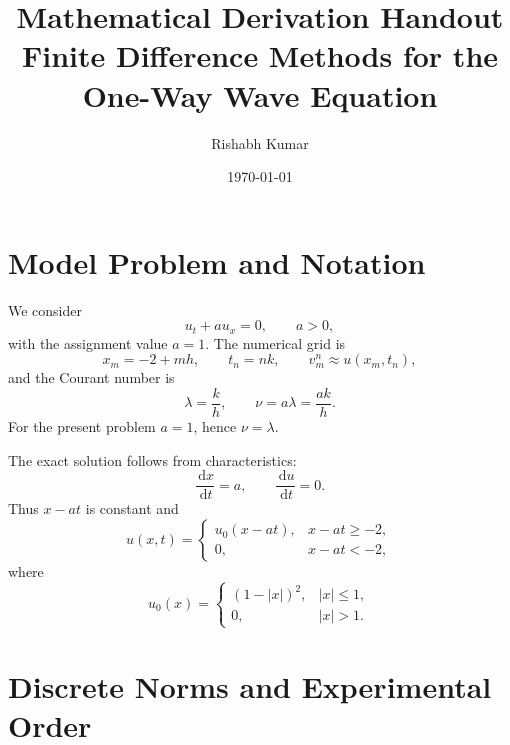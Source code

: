 \documentclass[11pt]{article}
\title{Mathematical Derivation Handout\\
Finite Difference Methods for the One-Way Wave Equation}
\author{Rishabh Kumar}
\date{\today}
\newcommand{\dd}{\,\mathrm{d}}
\begin{document}
\maketitle

\section{Model Problem and Notation}

We consider
\begin{equation}
    u_t+a u_x=0,\qquad a>0,
\end{equation}
with the assignment value $a=1$.  The numerical grid is
\begin{equation}
    x_m=-2+mh,\qquad t_n=nk,\qquad v_m^n\approx u(x_m,t_n),
\end{equation}
and the Courant number is
\begin{equation}
    \lambda=\frac{k}{h},\qquad \nu=a\lambda=\frac{ak}{h}.
\end{equation}
For the present problem $a=1$, hence $\nu=\lambda$.

The exact solution follows from characteristics:
\begin{equation}
    \frac{\dd x}{\dd t}=a,\qquad \frac{\dd u}{\dd t}=0.
\end{equation}
Thus $x-at$ is constant and
\begin{equation}
    u(x,t)=
    \begin{cases}
        u_0(x-at), & x-at\ge -2,\\
        0, & x-at<-2,
    \end{cases}
\end{equation}
where
\begin{equation}
    u_0(x)=
    \begin{cases}
        (1-|x|)^2, & |x|\le 1,\\
        0, & |x|>1.
    \end{cases}
\end{equation}

\section{Discrete Norms and Experimental Order}
\end{document}
